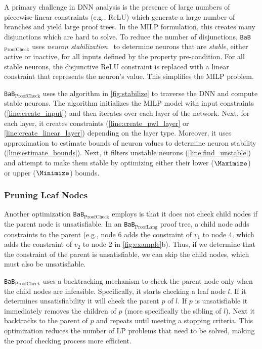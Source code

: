 \documentclass[oneside,11pt,dvipsnames]{book}
\numberwithin{equation}{section}
\theoremstyle{definition}
\theoremstyle{remark}
\newcommand{\hd}[1]{\iftoggle{usecomment}{{\color{blue}{[HD]: #1}}}{}}
\newcommand{\prooflang}{\texttt{BaB$_{\text{ProofLang}}$}}
\newcommand{\proofcheck}{\texttt{BaB$_{\text{ProofCheck}}$}}
\begin{document}
A primary challenge in DNN analysis is the presence of large numbers of piecewise-linear constraints (e.g., ReLU) which generate a large number of branches and yield large proof trees. In the MILP formulation, this creates many disjunctions which are hard to solve. To reduce the number of disjunctions, \proofcheck{} uses \emph{neuron stabilization}~\cite{duong2024harnessing}
to determine neurons that are \emph{stable}, either active or inactive, for all inputs defined by the property pre-condition.
For all stable neurons, the disjunctive ReLU constraint is replaced with a linear constraint that represents the neuron's value.   This simplifies the MILP problem.

\proofcheck{} uses the algorithm in \autoref{fig:stabilize} to traverse the DNN and compute stable neurons. The algorithm initializes the MILP model with input constraints (\autoref{line:create_input}) and then iterates over each layer of the network. 
Next, for each layer, it creates constraints (\autoref{line:create_pwl_layer} or \autoref{line:create_linear_layer}) depending on the layer type.
Moreover,  it uses approximation to estimate bounds of neuron values to determine neuron stability (\autoref{line:estimate_bounds}).
Next, it filters unstable neurons (\autoref{line:find_unstable}) and attempt to make them stable by optimizing either their lower ($\Maximize$) or upper ($\Minimize$) bounds.



\subsubsection{Pruning Leaf Nodes}\label{sec:pruning}

Another optimization \proofcheck{} employs is that it does not check child nodes if the parent node is unsatisfiable.
In an \prooflang{} proof tree, a child node adds constraints to the parent (e.g., node 6 adds the constraint of $v_1$ to node 4, which adds the constraint of $v_2$ to node 2 in \autoref{fig:example}b). Thus, if we determine that the constraint of the parent is unsatisfiable, we can skip the child nodes, which must also be unsatisfiable.  


\proofcheck{} uses a backtracking mechanism to check the parent node only when the child nodes are infeasible. Specifically, it starts checking a leaf node $l$. If it determines unsatisfiability it will check the parent $p$ of $l$. If $p$ is unsatisfiable it immediately removes the children of $p$ (more specifically the sibling of $l$). Next it backtracks to the parent of $p$ and repeats until meeting a stopping criteria. This optimization reduces the number of LP problems that need to be solved, making the proof checking process more efficient. 
\end{document}
